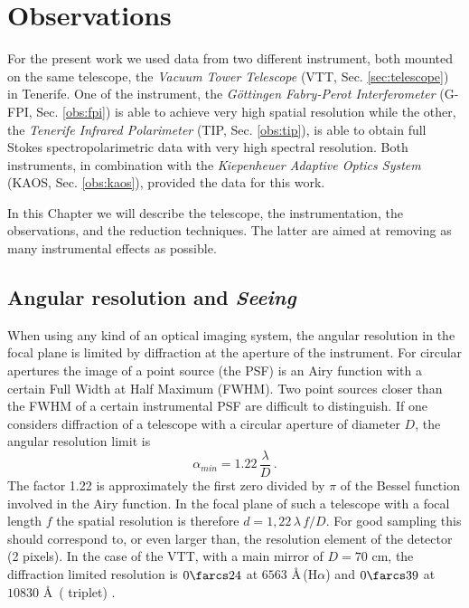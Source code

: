 \chapter{Observations}

For the present work we used data from two different instrument, both mounted on the same telescope, the \emph{ Vacuum Tower Telescope} (VTT, Sec. \ref{sec:telescope}) in Tenerife. One of the instrument, the \emph{G\"ottingen Fabry-Perot Interferometer} (G-FPI, Sec. \ref{obs:fpi}) is able to achieve very high spatial resolution while the other, the \emph{Tenerife Infrared Polarimeter} (TIP, Sec. \ref{obs:tip}), is able to obtain full Stokes spectropolarimetric data with very high spectral resolution. Both instruments, in combination with the \emph{Kiepenheuer Adaptive Optics System} (KAOS, Sec. \ref{obs:kaos}), provided the data for this work.

In this Chapter we will describe the telescope, the instrumentation, the observations, and the reduction techniques. The latter are aimed at removing as many instrumental effects as possible. 

\section{Angular resolution and \emph{Seeing}\label{seeing}}
When using any kind of an optical imaging system, the angular resolution in the focal plane is limited by diffraction at the aperture of the instrument. For circular apertures the image of a point source (the PSF) is an Airy function with a certain Full Width at Half Maximum (FWHM). Two point sources closer than the FWHM of a certain instrumental PSF  are difficult to distinguish. If one considers diffraction of a telescope with a circular aperture of diameter $D$, the angular resolution limit is
\begin{equation}
\alpha_{min}=1.22 \, \frac{ \lambda}{D} \, .
\label{ec:res}
\end{equation}
The factor 1.22 is approximately the first zero divided by $\pi$ of the Bessel function involved in the Airy function. In the focal plane of such a telescope with a focal length $f$ the spatial resolution is therefore $d=1,22 \, \lambda\, f/D$. For good sampling this should correspond to, or even larger than, the resolution element of the detector (2 pixels). In the case of the VTT, with a main mirror of $D=70$ cm, the diffraction limited resolution is $0\farcs24$ at $6563$ \AA\,(H$\alpha$) and $0\farcs39$ at $10830$ \AA\, ( triplet) .

